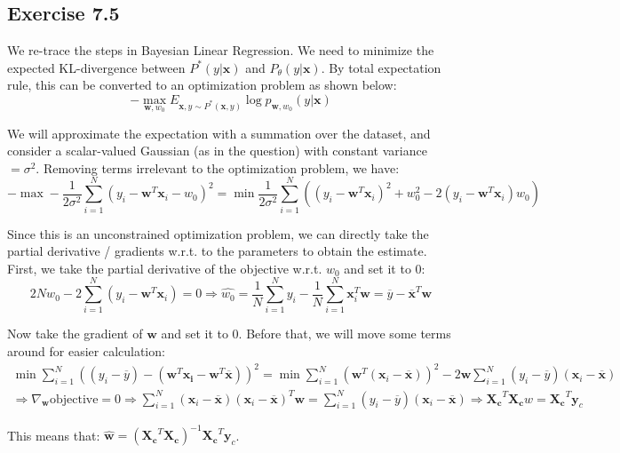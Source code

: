 \documentclass{article}
\newcommand{\vct}[1]{\mathbf{#1}}
\begin{document}
\subsection*{Exercise 7.5}
\begin{flushleft}
We re-trace the steps in Bayesian Linear Regression. We need to minimize the expected KL-divergence between \(P^{*}(y | \vct{x})\) and \(P_{\theta}(y | \vct{x})\). By total expectation rule, this can be converted to an optimization problem as shown below:
\begin{equation}
-\max_{\vct{w}, w_{0}} E_{\vct{x}, y \sim P^{*}(\vct{x}, y)} \log p_{\vct{w}, w_0}(y | \vct{x})
\end{equation}

We will approximate the expectation with a summation over the dataset, and consider a scalar-valued Gaussian (as in the question) with constant variance \(= \sigma^{2}\). Removing terms irrelevant to the optimization problem, we have:
\begin{equation}
-\max -\frac{1}{2\sigma^2} \sum_{i=1}^{N} (y_{i} - \vct{w}^{T}\vct{x}_{i} - w_{0})^{2} = \min \frac{1}{2\sigma^2} \sum_{i=1}^{N} \left((y_{i} - \vct{w}^{T}\vct{x}_{i})^{2} + w_{0}^{2} - 2(y_{i} - \vct{w}^{T}\vct{x}_{i})w_{0}\right)
\end{equation}

Since this is an unconstrained optimization problem, we can directly take the partial derivative / gradients w.r.t. to the parameters to obtain the estimate. First, we take the partial derivative of the objective w.r.t. \(w_{0}\) and set it to 0:
\begin{equation}
2Nw_{0} - 2\sum_{i=1}^{N}(y_{i} - \vct{w}^{T}\vct{x}_{i}) = 0 \Rightarrow \hat{w_{0}} = \frac{1}{N}\sum_{i=1}^{N}y_{i} - \frac{1}{N}\sum_{i=1}^{N}\vct{x}_{i}^{T}\vct{w} = \overline{y} - \overline{\vct{x}}^{T}\vct{w}
\end{equation}

Now take the gradient of \(\vct{w}\) and set it to 0. Before that, we will move some terms around for easier calculation:
\begin{multline}
\min \sum_{i=1}^{N} \left((y_{i} - \overline{y}) - (\vct{w}^{T}\vct{x_{i}} -\vct{w}^{T}\overline{\vct{x}})\right)^{2} = \min \sum_{i=1}^{N} (\vct{w}^{T}(\vct{x}_{i} - \overline{\vct{x}}))^{2} - 2\vct{w}\sum_{i=1}^{N} (y_{i} - \overline{y})(\vct{x}_{i} - \overline{\vct{x}}) \\
\Rightarrow \nabla_{\vct{w}} \text{objective} = 0 \Rightarrow \sum_{i=1}^{N} (\vct{x}_{i} - \overline{\vct{x}})(\vct{x}_{i} - \overline{\vct{x}})^{T}\vct{w} = \sum_{i=1}^{N}(y_{i} - \overline{y})(\vct{x}_{i} - \overline{\vct{x}}) \Rightarrow \vct{X_{c}}^{T}\vct{X_{c}}w = \vct{X_{c}}^{T}\vct{y}_{c}
\end{multline}

This means that: \(\hat{\vct{w}} = \left(\vct{X_{c}}^{T}\vct{X_{c}}\right)^{-1}\vct{X_{c}}^{T}\vct{y}_{c}\).
\end{flushleft}
\end{document}
